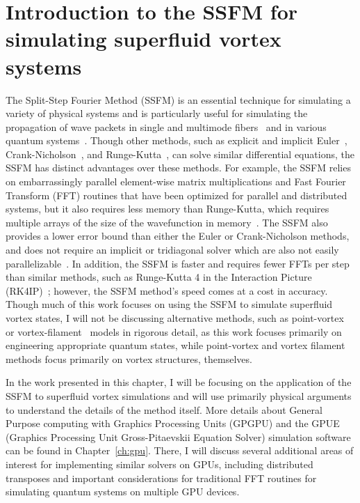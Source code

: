 \chapter{Introduction to the SSFM for simulating superfluid vortex systems}
\label{ch:splitop}
The Split-Step Fourier Method (SSFM) is an essential technique for simulating a variety of physical systems and is particularly useful for simulating the propagation of wave packets in single and multimode fibers~\cite{agrawal2000, sinkin2003, meirelles2005, min2003} and in various quantum systems~\cite{bayindir2015, weideman1986, wang2005}.
Though other methods, such as explicit and implicit Euler~\cite{butcher2016}, Crank-Nicholson~\cite{crank1947}, and Runge-Kutta~\cite{butcher2016}, can solve similar differential equations, the SSFM has distinct advantages over these methods.
For example, the SSFM relies on embarrassingly parallel element-wise matrix multiplications and Fast Fourier Transform (FFT) routines that have been optimized for parallel and distributed systems, but it also requires less memory than Runge-Kutta, which requires multiple arrays of the size of the wavefunction in memory~\cite{murray2011}.
The SSFM also provides a lower error bound than either the Euler or Crank-Nicholson methods, and does not require an implicit or tridiagonal solver \cite{conte2017, thomas1949} which are also not easily parallelizable~\cite{goddeke2010, wang1981, sweet1977}.
In addition, the SSFM is faster and requires fewer FFTs per step than similar methods, such as Runge-Kutta 4 in the Interaction Picture (RK4IP)~\cite{brehler2017}; however, the SSFM method's speed comes at a cost in accuracy.
Though much of this work focuses on using the SSFM to simulate superfluid vortex states, I will not be discussing alternative methods, such as point-vortex~\cite{benzi1992} or vortex-filament~\cite{schwarz1988} models in rigorous detail, as this work focuses primarily on engineering appropriate quantum states, while point-vortex and vortex filament methods focus primarily on vortex structures, themselves.

In the work presented in this chapter, I will be focusing on the application of the SSFM to superfluid vortex simulations and will use primarily physical arguments to understand the details of the method itself.
More details about General Purpose computing with Graphics Processing Units (GPGPU) and the GPUE (Graphics Processing Unit Gross-Pitaevskii Equation Solver) simulation software can be found in Chapter~\ref{ch:gpu}.
There, I will discuss several additional areas of interest for implementing similar solvers on GPUs, including distributed transposes and important considerations for traditional FFT routines for simulating quantum systems on multiple GPU devices.

